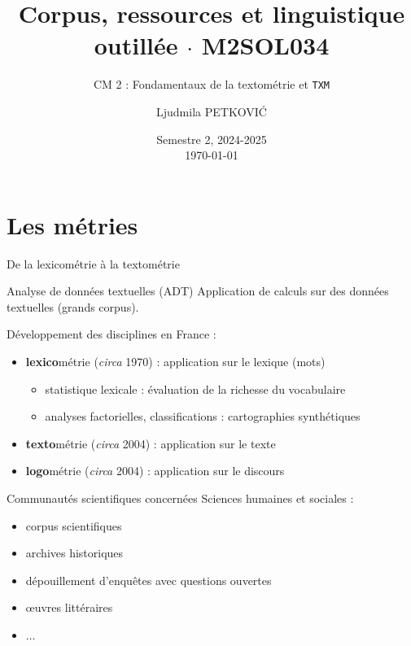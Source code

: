 \documentclass[xetex,xcolor={table,usenames,dvipsnames}]{beamer}
\newcommand{\bolder}[1]{{\color{purple}\bfseries#1}}
\begin{document}
\title{{\large Corpus, ressources et linguistique outillée $\cdot$ \textsc{M2SOL034}}}
\subtitle{CM 2 : Fondamentaux de la textométrie et \texttt{TXM}}
\author{\footnotesize{Ljudmila PETKOVI\'C}}
\date{\scriptsize{Semestre 2, 2024-2025\\\today}}



	\frame{\titlepage}

\section{Les \og{}métries\fg{}}


\begin{frame}{De la lexicométrie à la textométrie}
	\begin{block}{Analyse de données textuelles (\textsc{ADT})}
		\justifying Application de calculs sur des données textuelles (grands corpus).
	\end{block}
	Développement des disciplines en France :
	\begin{itemize}
		\item \bolder{lexico}métrie (\textit{circa} 1970) : application sur le lexique (mots)
		\begin{itemize}
			\item statistique lexicale : évaluation de la richesse du vocabulaire
			\item analyses factorielles, classifications : cartographies synthétiques
		\end{itemize}
		\item \bolder{texto}métrie (\textit{circa} 2004) : application sur le texte
		\item \bolder{logo}métrie (\textit{circa} 2004) : application sur le discours
	\end{itemize}
\end{frame}

\begin{frame}{Communautés scientifiques concernées}
	Sciences humaines et sociales :
	\begin{itemize}
		\item corpus scientifiques
		\item archives historiques
		\item dépouillement d'enquêtes avec questions ouvertes
		\item \oe{}uvres littéraires
		\item $\dots$
	\end{itemize}
\end{frame}
\end{document}
